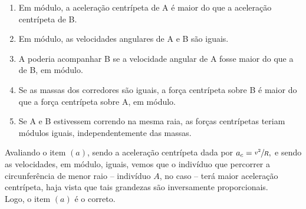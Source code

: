 \begin{exemplo}
\begin{center}
\begin{tikzpicture}[scale=0.75]
\end{tikzpicture}
\end{center}




\begin{enumerate}
    \item [(a)] Em módulo, a aceleração centrípeta de A é maior do que a aceleração centrípeta de B.
    
    \item [(b)] Em módulo, as velocidades angulares de A e B são iguais.
    
    \item [(c)] A poderia acompanhar B se a velocidade angular de A fosse maior do que a de B, em módulo.
    
    \item [(d)] Se as massas dos corredores são iguais, a força centrípeta sobre B é maior do que a força centrípeta sobre A, em módulo.
    
    \item [(e)] Se A e B estivessem correndo na mesma raia, as forças centrípetas teriam módulos iguais, independentemente das massas.
\end{enumerate}


\resolucao

Avaliando o item $(a)$, sendo a aceleração centrípeta dada por $a_c = \sfrac{v^2}{R},$ e sendo as velocidades, em módulo, iguais, vemos que o indivíduo que percorrer a circunferência de menor raio -- indivíduo $A$, no caso -- terá maior aceleração centrípeta, haja vista que tais grandezas são inversamente proporcionais. \\

Logo, o item $(a)$ é o correto.

    
\end{exemplo}




\vspace{0.3cm}

